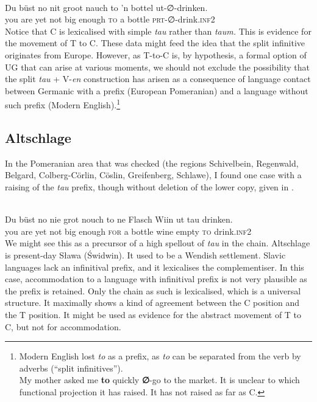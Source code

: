 \documentclass[output=paper,hidelinks,draftmode]{langscibook}
\begin{document}
\ea\label{ex:postma:9}\\
\gll Du büst no nit groot nauch to {'n} bottel ut-∅-drinken. \\
       you are yet not big enough \textsc{to} a bottle \textsc{prt}-∅-drink.\textsc{inf2}\\
       \glt {}\z
Notice that C is lexicalised with simple \textit{tau} rather than \textit{taum.} This is evidence for the movement of T to C. These data might feed the idea that the split infinitive originates from Europe. However, as T-to-C is, by hypothesis, a formal option of UG that can arise at various moments, we should not exclude the possibility that the split \textit{tau} + V-\textit{en} construction has arisen as a consequence of language contact between Germanic with a prefix (European Pomeranian) and a language without such prefix (Modern English).\footnote{Modern English lost \textit{to} as a prefix, as \textit{to} can be separated from the verb by adverbs (``split infinitives''). \\
\vspace{-\baselineskip}
\ea My mother asked me \textbf{to} quickly \textbf{∅}{}-go to the market.\z
It is unclear to which functional projection it has raised. It has not raised as far as C.}

\subsection{Altschlage}

In the Pomeranian area that was checked (the regions Schivelbein, Regenwald, Belgard, Colberg-Cörlin, Cöslin, Greifenberg, Schlawe), I found one case with a raising of the \textit{tau} prefix, though without deletion of the lower copy, given in .


\ea\label{ex:postma:10} \\
\gll Du büst no nie grot nouch to ne Flasch Wiin ut tau drinken. \\
     you are yet not big enough \textsc{for} a bottle wine empty \textsc{to} drink.\textsc{inf2}\\
     \glt {}\z
We might see this as a precursor of a high spellout of \textit{tau} in the chain. Altschlage is present-day Sława (Świdwin). It used to be a Wendish settlement. Slavic languages lack an infinitival prefix, and it lexicalises the complementiser. In this case, accommodation to a language with infinitival prefix is not very plausible as the prefix is retained. Only the chain as such is lexicalised, which is a universal structure. It maximally shows a kind of agreement between the C position and the T position. It might be used as evidence for the abstract movement of T to C, but not for accommodation.
\end{document}
